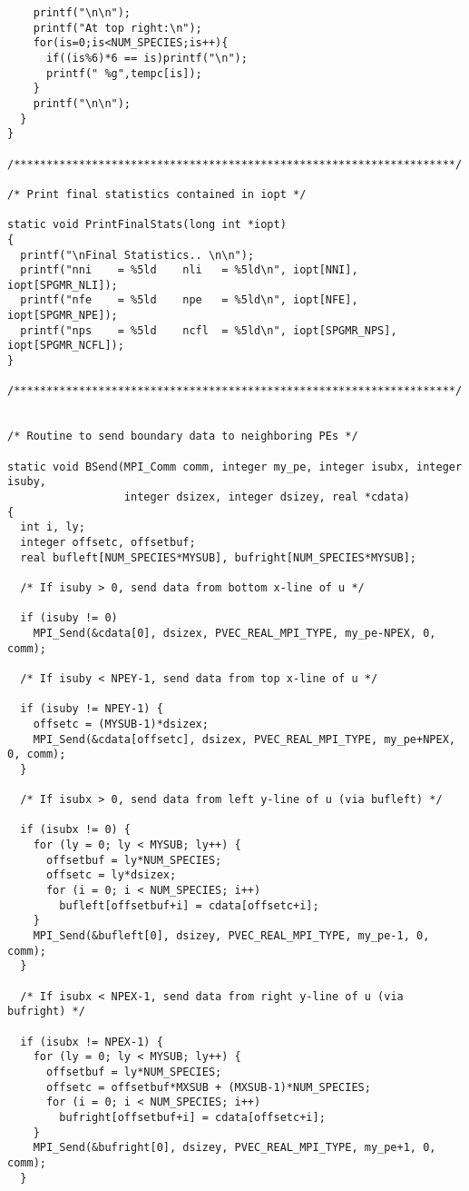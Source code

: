 \begin{verbatim}
    printf("\n\n");
    printf("At top right:\n");
    for(is=0;is<NUM_SPECIES;is++){
      if((is%6)*6 == is)printf("\n");
      printf(" %g",tempc[is]);
    }
    printf("\n\n");
  }
}

/********************************************************************/

/* Print final statistics contained in iopt */

static void PrintFinalStats(long int *iopt)
{
  printf("\nFinal Statistics.. \n\n");
  printf("nni    = %5ld    nli   = %5ld\n", iopt[NNI], iopt[SPGMR_NLI]);
  printf("nfe    = %5ld    npe   = %5ld\n", iopt[NFE], iopt[SPGMR_NPE]);
  printf("nps    = %5ld    ncfl  = %5ld\n", iopt[SPGMR_NPS], iopt[SPGMR_NCFL]);
}

/********************************************************************/


/* Routine to send boundary data to neighboring PEs */

static void BSend(MPI_Comm comm, integer my_pe, integer isubx, integer isuby,
                  integer dsizex, integer dsizey, real *cdata)
{
  int i, ly;
  integer offsetc, offsetbuf;
  real bufleft[NUM_SPECIES*MYSUB], bufright[NUM_SPECIES*MYSUB];

  /* If isuby > 0, send data from bottom x-line of u */

  if (isuby != 0)
    MPI_Send(&cdata[0], dsizex, PVEC_REAL_MPI_TYPE, my_pe-NPEX, 0, comm);

  /* If isuby < NPEY-1, send data from top x-line of u */

  if (isuby != NPEY-1) {
    offsetc = (MYSUB-1)*dsizex;
    MPI_Send(&cdata[offsetc], dsizex, PVEC_REAL_MPI_TYPE, my_pe+NPEX, 0, comm);
  }

  /* If isubx > 0, send data from left y-line of u (via bufleft) */

  if (isubx != 0) {
    for (ly = 0; ly < MYSUB; ly++) {
      offsetbuf = ly*NUM_SPECIES;
      offsetc = ly*dsizex;
      for (i = 0; i < NUM_SPECIES; i++)
        bufleft[offsetbuf+i] = cdata[offsetc+i];
    }
    MPI_Send(&bufleft[0], dsizey, PVEC_REAL_MPI_TYPE, my_pe-1, 0, comm);   
  }

  /* If isubx < NPEX-1, send data from right y-line of u (via bufright) */

  if (isubx != NPEX-1) {
    for (ly = 0; ly < MYSUB; ly++) {
      offsetbuf = ly*NUM_SPECIES;
      offsetc = offsetbuf*MXSUB + (MXSUB-1)*NUM_SPECIES;
      for (i = 0; i < NUM_SPECIES; i++)
        bufright[offsetbuf+i] = cdata[offsetc+i];
    }
    MPI_Send(&bufright[0], dsizey, PVEC_REAL_MPI_TYPE, my_pe+1, 0, comm);   
  }


\end{verbatim}
